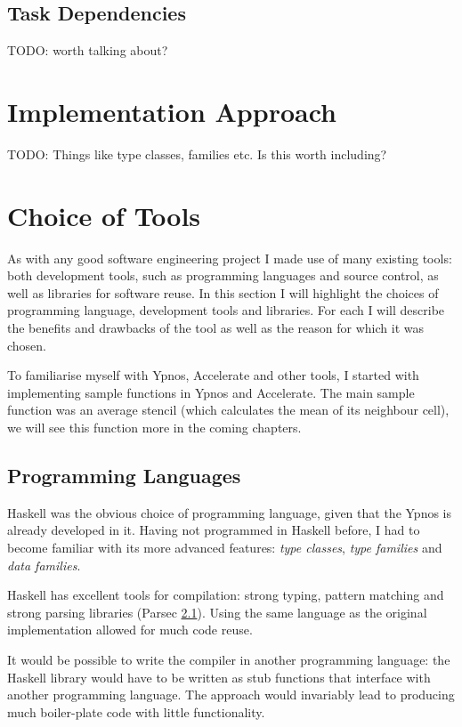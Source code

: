 \documentclass[12pt,a4paper,oneside]{scrbook}
\begin{document}
\subsection{Task Dependencies}

TODO: worth talking about?

\section{Implementation Approach}
TODO: Things like type classes, families etc. Is this worth including?

\section{Choice of Tools}

As with any good software engineering project I made use of many existing tools:
both development tools, such as programming languages and source control, as
well as libraries for software reuse. In this section I will highlight the
choices of programming language, development tools and libraries. For each I
will describe the benefits and drawbacks of the tool as well as the reason for
which it was chosen.

To familiarise myself with Ypnos, Accelerate and other tools, I started with
implementing sample functions in Ypnos and Accelerate. The main sample function was an
average stencil (which calculates the mean of its neighbour cell), we will see
this function more in the coming chapters.

\subsection{Programming Languages}

Haskell was the obvious choice of programming language, given that the Ypnos is
already developed in it. Having not programmed in Haskell before, I had to
become familiar with its more advanced features: \emph{type classes}, \emph{type
  families} and \emph{data families}.

Haskell has excellent tools for compilation: strong typing, pattern matching and
strong parsing libraries (Parsec \ref{}). Using the same language as the
original implementation allowed for much code reuse.

It would be possible to write the compiler in another programming language: the
Haskell library would have to be written as stub functions that interface with another
programming language. The approach would invariably lead to producing much
boiler-plate code with little functionality.
\end{document}
